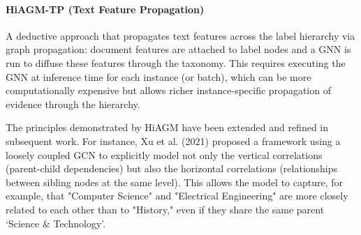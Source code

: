 \paragraph{HiAGM-TP (Text Feature Propagation)}
A deductive approach that propagates text features across the label hierarchy via graph propagation: document features are attached to label nodes and a GNN is run to diffuse these features through the taxonomy. This requires executing the GNN at inference time for each instance (or batch), which can be more computationally expensive but allows richer instance-specific propagation of evidence through the hierarchy.

The principles demonstrated by HiAGM have been extended and refined in subsequent work. For instance, Xu et al. (2021) proposed a framework using a loosely coupled GCN to explicitly model not only the vertical correlations (parent-child dependencies) but also the horizontal correlations (relationships between sibling nodes at the same level). This allows the model to capture, for example, that "Computer Science" and "Electrical Engineering" are more closely related to each other than to "History," even if they share the same parent `Science \& Technology'.
